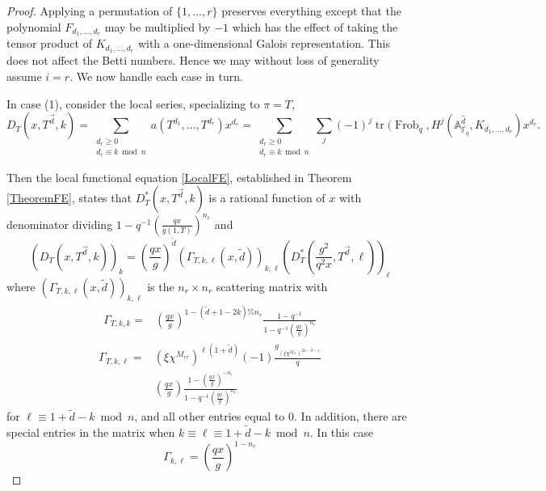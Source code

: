 \documentclass[11pt,letterpaper]{article}
\theoremstyle{definition}
\theoremstyle{remark}
\numberwithin{equation}{section}
\theoremstyle{dotless}
\renewcommand{\tilde}{\widetilde}
\begin{document}
\begin{proof} Applying a permutation of $\{1,\dots, r\} $ preserves everything except that the polynomial $F_{d_1,\dots,d_r}$ may be multiplied by $-1$ which has the effect of taking the tensor product of $K_{d_1,\dots,d_r}$ with a one-dimensional Galois representation. This does not affect the Betti numbers. Hence we may without loss of generality assume $i=r$. We now handle each case in turn.

In case (1), consider the local series, specializing to $\pi=T $,
\begin{equation} D_T ( x, T^{\vec{d}}, k ) = \sum_{\substack{ d_r \geq 0 \\ d_r \equiv k \bmod n}} a ( T^{d_1},\dots, T^{d_{r}})  x^{d_r } =\sum_{\substack{ d_r \geq 0 \\ d_r \equiv k \bmod n}} \sum_{j} (-1)^j \operatorname{tr}( \operatorname{Frob}_q, H^j( \mathbb A^{\hat{d}}_{\overline{\mathbb F_q}}, K_{d_1,\dots,d_{r}})x^{d_r}.\end{equation}

Then the local functional equation \eqref{LocalFE}, established in Theorem \ref{TheoremFE}, states that  $D_T^* ( x, T^{\vec{d}}, k )$ is a rational function of $x$ with denominator dividing $1-q^{-1 } \left( \frac{qx}{g(1,T)}\right)^{n_r }$ and 
\begin{equation} 
\left( D_T ( x, T^{\vec{d}}, k ) \right)_k =  \left( \frac{qx}{g} \right)^{\tilde{d}} \left( \Gamma_{T, k, \ell}(x, \tilde{d}) \right)_{k, \ell}  \left(  D_T^* ( \frac{g^2}{q^2x}, T^{\vec{d}}, \ell )\right)_\ell 
\end{equation}
where $ \left( \Gamma_{T, k, \ell}(x, \tilde{d}) \right)_{k, \ell}$ is the $n_r \times n_r$ scattering matrix with
\begin{equation*}
\begin{split}
\Gamma_{T, k,k} =& \left( \frac{qx}{g}\right)^{ 1- (\tilde{d}+1-2k)\% n_r } \frac{1-q^{-1}}{1-q^{-1}\left( \frac{q x}{g}\right)^{n_r}}
\end{split}
\end{equation*}
\begin{equation*}
\begin{split}
\Gamma_{T, k,\ell} =& (\xi \chi^{M_{rr}}) ^{\ell(1+\tilde{d})}(-1)\frac{g_{(\xi \chi^{M_{rr}} )^{2k-\tilde{d} -1}}}{q} \\
 &\left( \frac{qx}{g}\right) \frac{1-\left(\frac{q x}{g}\right)^{-n_r}}{1-q^{-1}\left(\frac{q x}{g}\right)^{n_r}}
 \end{split}
\end{equation*}for $\ell \equiv 1+\tilde{d} -k \bmod n$, and all other entries equal to $0$. In addition, there are special entries in the matrix when $k \equiv \ell \equiv 1+\tilde{d}-k \bmod n$. In this case 
\begin{equation*}
\Gamma_{k,\ell}=\left(\frac{qx}{g}\right)^{1-n_r}
\end{equation*}




\end{proof}
\end{document}
